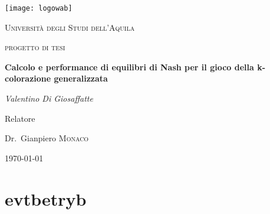 \documentclass[12pt,a4paper,oneside]{book}
\begin{document}
\begin{titlepage}

	\centering
	
	\texttt{[image: logowab]}	
	
	\vspace{0.5cm}
	
	{\scshape\LARGE Università degli Studi dell'Aquila \par}

	\vspace{1cm}

	{\scshape\Large progetto di tesi \par}

	\vspace{1cm}

	{\huge\bfseries Calcolo e performance di equilibri di Nash per il gioco della k-colorazione generalizzata \par}

	\vspace{1.5cm}

	{\Large\itshape Valentino Di Giosaffatte \par}

	\vfill
	Relatore\par
	Dr.~Gianpiero \textsc{Monaco}

	\vfill


	{\large \today\par}
	
	\vspace{0.2cm}
	
\end{titlepage}


\chapter{evtbetryb}
\end{document}
